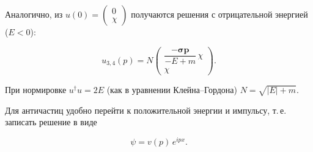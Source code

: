 \documentclass[../final.tex]{subfiles}
\begin{document}
Аналогично, из $u(0)=\begin{pmatrix}0\\\chi\end{pmatrix}$ получаются
решения с отрицательной энергией ($E<0$):

\begin{equation*}
    u_{3,4}(p)
    =
    N
    \begin{pmatrix}
        \dfrac{-\boldsymbol\sigma\mathbf p}{-E+m}\,\chi\\[8pt]
        \chi
    \end{pmatrix}.
\end{equation*}

При нормировке $u^\dagger u=2E$ (как в уравнении Клейна--Гордона)
$N=\sqrt{|E|+m}$.

Для античастиц удобно перейти к положительной энергии и
импульсу, т.\,е. записать решение в виде

\begin{equation*}
    \psi=v(p)\,e^{ipx}.
\end{equation*}
\end{document}
